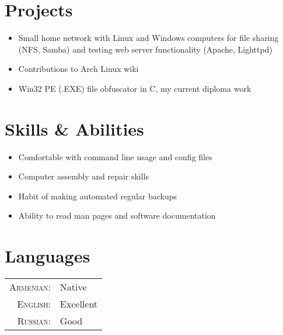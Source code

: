 \documentclass[a4paper,10pt]{article}
\begin{document}
\section{Projects}
\begin{itemize}
\item Small home network with Linux and Windows computers for file sharing (NFS, Samba)
and testing web server functionality (Apache, Lighttpd)
\item Contributions to Arch Linux wiki\\
{}
\item Win32 PE (.EXE) file obfuscator in C, my current diploma work\\
{}
\end{itemize}

\section{Skills \& Abilities}
\begin{itemize}
\item Comfortable with command line usage and config files
\item Computer assembly and repair skills
\item Habit of making automated regular backups
\item Ability to read man pages and software documentation
\end{itemize}

\section{Languages}
\begin{tabular}{r l}
\textsc{Armenian}: & Native\\
\textsc{English}: & Excellent\\
\textsc{Russian}: & Good
\end{tabular}
\end{document}
